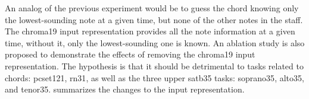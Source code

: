 
An analog of the previous experiment would be to guess the
chord knowing only the lowest-sounding note at a given time,
but none of the other notes in the staff. The \gls{chroma19}
input representation provides all the note information at a
given time, without it, only the lowest-sounding one is
known. An ablation study is also proposed to demonstrate the
effects of removing the \gls{chroma19} input representation.
The hypothesis is that it should be detrimental to tasks
related to chords: \gls{pcset121}, \gls{rn31}, as well as
the three upper \gls{satb35} tasks: \gls{soprano35},
\gls{alto35}, and \gls{tenor35}. 
summarizes the changes to the input representation.


